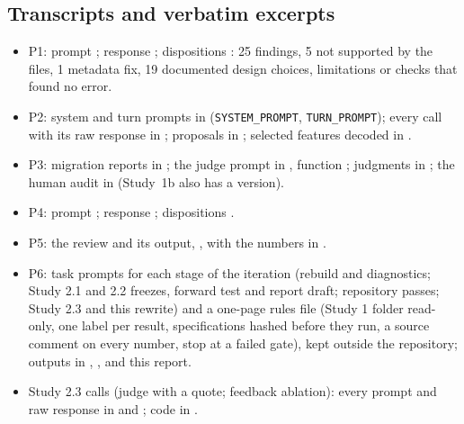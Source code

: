 \documentclass[11pt,letterpaper]{article}
\begin{document}
\subsection{Transcripts and verbatim excerpts}\label{app:transcripts}
\begin{itemize}
  \item P1: prompt ; response ; dispositions : 25 findings, 5 not supported by the files, 1 metadata fix, 19 documented design choices, limitations or checks that found no error. %
  \item P2: system and turn prompts in  (\texttt{SYSTEM\_PROMPT}, \texttt{TURN\_PROMPT}); every call with its raw response in ; proposals in ; selected features decoded in .
  \item P3: migration reports in ; the judge prompt in , function ; judgments in ; the human audit in  (Study~1b also has a  version).
  \item P4: prompt ; response ; dispositions .
  \item P5: the review and its output, , with the numbers in .
  \item P6: task prompts for each stage of the iteration (rebuild and diagnostics; Study 2.1 and 2.2 freezes, forward test and report draft; repository passes; Study 2.3 and this rewrite) and a one-page rules file (Study 1 folder read-only, one label per result, specifications hashed before they run, a source comment on every number, stop at a failed gate), kept outside the repository; outputs in , ,  and this report.
  \item Study 2.3 calls (judge with a quote; feedback ablation): every prompt and raw response in  and ; code in .
\end{itemize}
\end{document}
